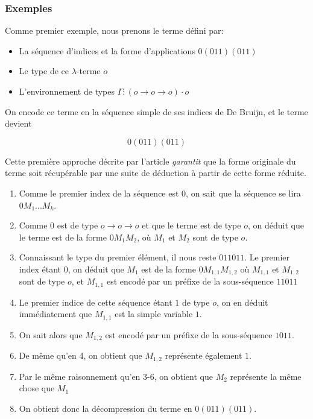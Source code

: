 \documentclass[titlepage]{article}
\providecommand{\tightlist}{%
  \setlength{\itemsep}{0pt}\setlength{\parskip}{0pt}}
\begin{document}
\subsubsection{Exemples}\label{exemples}

Comme premier exemple, nous prenons le terme défini par:

\begin{itemize}
\tightlist
\item
  La séquence d'indices et la forme d'applications \(0(011)(011)\)
\item
  Le type de ce \(\lambda\)-terme \(o\)
\item
  L'environnement de types
  \(\Gamma: (o \rightarrow o \rightarrow o) \cdot o\)
\end{itemize}

On encode ce terme en la séquence simple de ses indices de De Bruijn, et
le terme devient

\[0(011)(011)\]

Cette première approche décrite par l'article \emph{garantit} que la
forme originale du terme soit récupérable par une suite de déduction à
partir de cette forme réduite.

\begin{enumerate}
\def\labelenumi{\arabic{enumi}.}
\tightlist
\item
  Comme le premier index de la séquence est 0, on sait que la séquence
  se lira \(0M_1...M_k\).
\item
  Comme \(0\) est de type \(o \rightarrow o \rightarrow o\) et que le
  terme est de type \(o\), on déduit que le terme est de la forme
  \(0M_1M_2\), où \(M_1\) et \(M_2\) sont de type \(o\).
\item
  Connaissant le type du premier élément, il nous reste \(011011\). Le
  premier index étant 0, on déduit que \(M_1\) est de la forme
  \(0M_{1,1}M_{1,2}\) où \(M_{1,1}\) et \(M_{1,2}\) sont de type \(o\),
  et \(M_{1,1}\) est encodé par un préfixe de la sous-séquence \(11011\)
\item
  Le premier indice de cette séquence étant \(1\) de type \(o\), on en
  déduit immédiatement que \(M_{1,1}\) est la simple variable \(1\).
\item
  On sait alors que \(M_{1,2}\) est encodé par un préfixe de la
  sous-séquence \(1011\).
\item
  De même qu'en 4, on obtient que \(M_{1,2}\) représente également
  \(1\).
\item
  Par le même raisonnement qu'en 3-6, on obtient que \(M_2\) représente
  la même chose que \(M_1\)
\item
  On obtient donc la décompression du terme en \(0(011)(011)\).
\end{enumerate}
\end{document}
